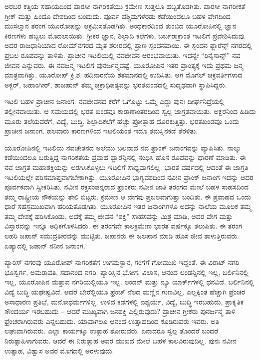ಅರಬರ ಕತ್ತಿಯ ಸಹಾಯದಿಂದ ಪಾರಸೀ ನಾಗರಿಕತೆಯು ಕ್ರಮೇಣ ಸುತ್ತಲೂ ಹಬ್ಬತೊಡಗಿತು. ಪಾರಸೀ ನಾಗರೀಕತೆ ಗ್ರೀಕ್​ ಮತ್ತು ಹಿಂದೂ ದೇಶದಿಂದ ಬಂದುದು. ಪೂರ್ವ ಪಶ್ಚಿಮಗಳೆರಡು ಕಡೆಯಿಂದಲೂ ಬಹಳ ವೇಗದಿಂದ ಮುಸಲ್ಮಾನ ತರಂಗ ಯೂರೋಪನ್ನು ಆಕ್ರಮಿಸತೊಡಗಿತು. ಅಂಧಕಾರದಿಂದ ತುಂಬಿದ ಯೂರೋಪಿನಲ್ಲಿ ಜ್ಞಾನ ಕಿರಣಗಳು ಹಬ್ಬಲು ಮೊದಲಾಯಿತು. ಗ್ರೀಕರ ಜ್ಞಾನ, ಶಿಲ್ಪಾದಿ ಕಲೆಗಳು, ಬರ್ಬರಾ\break ಕ್ರಾಂತ ಇಟಲಿಗೆ ಪ್ರವೇಶಿಸಿದುವು. ಅದರ ರಾಜಧಾನಿಯಾದ ರೋಮ್​ನಗರದ ಮೃತ ಶರೀರದಲ್ಲಿ ಪ್ರಾಣ ಸ್ಪಂದನವಾಯಿ. ಈ ಸ್ಪಂದನ ಫ್ಲಾರೆನ್ಸ್​ ನಗರದಲ್ಲಿ ಪ್ರಬಲ ರೂಪವನ್ನು ತಾಳಿತು. ಪ್ರಾಚೀನ ಇಟಲಿಯಲ್ಲಿ ನವಜೀವನ ಆರಂಭವಾಯಿತು. ಇದನ್ನೇ “ರಿನೈಸಾನ್ಸ್​” ನವ ಜೀವನ ಎನ್ನುವರು. ಈ ನವಜನ್ಮ ಇಟಲಿಗೆ ಪುನರ್ಜನ್ಮವಷ್ಟೆ. ಯೂರೋಪಿನ ಇತರ ಪ್ರಾಂತ್ಯಕ್ಕೆ ಇದು ಪ್ರಥಮ ಜನ್ಮ ಮಾತ್ರವಾಗಿತ್ತು. ಯೂರೋಪ್​ ಕ್ರಿ.ಶ. ಹದಿನಾರನೆಯ ಶತಮಾನದಲ್ಲಿ ಉದಿಸಿತು. ಆಗ ಮೊಗಲ್​ ಚಕ್ರವರ್ತಿಗಳಾದ ಅಕ್ಬರ್​, ಜಹಾಂಗೀರ್​, ಶಾಜಹಾನ್​ ತಮ್ಮ ಚಕ್ರಾಧಿಪತ್ಯವನ್ನು ಭರತಖಂಡದಲ್ಲಿ ಸುದೃಢವಾಗಿ ಸ್ಥಾಪಿಸಿದ್ದರು.

ಇಟಲಿ ಬಹಳ ಪ್ರಾಚೀನ ಜನಾಂಗ. ನವಜೀವನದ ಕರೆಗೆ ಓಗೊಟ್ಟು ಒಮ್ಮೆ ಎದ್ದು ಪುನಃ ದೀರ್ಘನಿದ್ರೆಯಲ್ಲಿ ತಲ್ಲೀನವಾಯಿತು. ಆ ಸಮಯದಲ್ಲಿ ಭರತ ಖಂಡವೂ ಕಾರಾಣಾಂತರ\break ದಿಂದ ಸ್ವಲ್ಪ ಜಾಗ್ರತವಾಯಿತು. ಅಕ್ಬರನಿಂದ ಹಿಡಿದು ಮೂರು ತಲೆಯವರೆಗೆ, ವಿದ್ಯೆ, ಬುದ್ಧಿ, ಶಿಲ್ಪಾದಿಕಲೆಗೆ ಹೆಚ್ಚು ಪ್ರೋತ್ಸಾಹ ದೊರಕುತ್ತಿತ್ತು. ಭರತಖಂಡವೂ ಒಂದು ಪ್ರಾಚೀನ ಜನಾಂಗ. ಹಲವಾರು ಕಾರಣಗಳಿಂದ ಇಟಲಿಯಂತೆ ಇದೂ ತಮಸ್ಸಿನಕಡೆ ತೆರಳಿತು.

ಯೂರೋಪಿನಲ್ಲಿ ಇಟಲಿಯ ನವಚೇತನದ ಅಲೆಯು ಬಲವಾದ ನವ ಫ್ರಾಂಕ್​ ಜನಾಂಗವನ್ನು ವ್ಯಾಪಿಸಿತು. ನಾಲ್ಕು ಕಡೆಯಿಂದಲೂ ಬರುತ್ತಿದ್ದ ನಾಗರಿಕತೆಯ ಪ್ರವಾಹ ಫ್ಲಾರೆನ್ಸಿನಲ್ಲಿ ಸಂಧಿಸಿ ಹೊಸ ರೂಪವನ್ನು ಧಾರಣೆ ಮಾಡಿತು. ಈ ನವ ಜಾಗ್ರತ ಮಹಾಶಕ್ತಿಯನ್ನು ಅರಗಿಸಿಕೊಳ್ಳಲು ಇಟಲಿಗೆ ಸಾಧ್ಯವಾಗಲಿಲ್ಲ. ಭಾರತ ವರ್ಷದಲ್ಲಿ ಆದಂತೆ ಈ ಜಾಗ್ರತಿ ಇಟಲಿಯಲ್ಲೇ ಪರಿಸಮಾಪ್ತವಾಗಬೇಕಾಗಿತ್ತು. ಯೂರೋಪಿನ ಭಾಗ್ಯವಶದಿಂದ ನವೀನ ಫ್ರಾಂಕ್​ ಜನಾಂಗ ಇದನ್ನು ಆದರ ಪೂರ್ವಕವಾಗಿ ಸ್ವೀಕರಿಸಿತು. ನವೀನ ರಕ್ತಸಂಪನ್ನ\break ರಾದ ಫ್ರಾಂಕರು ನವೀನ ಜಾತಿ ತರಂಗದ ಮೇಲೆ ಬಹಳ ಸಾಹಸದಿಂದ ತಮ್ಮ ರಾಷ್ಟ್ರೀಯ ನೌಕೆಯನ್ನು ತೇಲಿ ಬಿಟ್ಟರು. ಕ್ರಮೇಣ ಆ ವೇಗವು ಪ್ರಬಲವಾಗುತ್ತಾ ಬಂದಿತು. ಈ ಪ್ರವಾಹದ ಒಂದು ಧಾರೆ ಸಹಸ್ರಮುಖವಾಗಿ ಹರಿಯತೊಡಗಿತು. ಯೂರೋಪಿನ ಇತರ ಜನಾಂಗಗಳೂ ಅದನ್ನು ನಾಲೆಯ ಮೂಲಕ ತಮ್ಮ ತಮ್ಮ ದೇಶಕ್ಕೆ ಹರಿಸಿಕೊಂಡು, ಅದಕ್ಕೆ ತಮ್ಮ ಜೀವನ “ಶಕ್ತಿ” ಸಾಹಸವನ್ನು ಮಿಶ್ರ ಮಾಡಿ, ಅದರ ವೇಗ ಮತ್ತು ವಿಸ್ತಾರವನ್ನು ಇನ್ನೂ ಅಧಿಕಗೊಳಸಿದರು. ಈ ತರಂಗವೇ ಕಾಲಕ್ರಮೇಣ ಭಾರತ ವರ್ಷಕ್ಕೂ ತಲುಪಿತು. ಈ ತರಂಗ ಲಹರಿ ಜಪಾನ್​ ಸಮುದ್ರತೀರವನ್ನು ಮುಟ್ಟಿತು. ಜಪಾನರು ಈ ಜಲಪಾನ ಮಾಡಿ ಹೊಸ ಜೀವ ತಾಳುತ್ತಿರುವರು. ಏಷ್ಯಾದಲ್ಲಿ ಜಪಾನ್​ ನನೀನ ಜನಾಂಗ.

ಪ್ಯಾರಿಸ್​ ನಗರವು ಯೂರೋಪ್​ ನಾಗರಿಕತೆಗೆ ಉಗಮಸ್ಥಾನ, ಗಂಗೆಗೆ ಗೋಮುಖಿ ಇದ್ದಂತೆ. ಈ ವಿರಾಟ್​ ನಗರಿ ಭೂಸ್ವರ್ಗ, ಅಮರಾವತಿ, ಸದಾನಂದ ನಗರಿ. ಪ್ಯಾರಿಸ್ಸಿನ ಭೋಗ, ವಿಲಾಸ, ಆನಂದ ಲಂಡನ್ನಿನಲ್ಲಿ ಇಲ್ಲ, ಬರ್ಲಿನಿನಲ್ಲಿ ಇಲ್ಲ, ಯೂರೋಪಿನ ಮತ್ತಾವ ನಗರಿಯಲ್ಲಿಯೂ ಇಲ್ಲ. ಲಂಡನ್​ ಮತ್ತು ನ್ಯೂ ಯಾರ್ಕ್​ಗಳಲ್ಲಿ ಧನವಿದೆ. ಬರ್ಲಿನಿನಲ್ಲಿ ವಿದ್ಯೆ ಬುದ್ಧಿ ಯಥೇಷ್ಟವಿದೆ. ಆದರೆ ಬೇರೆಲ್ಲಿಯೂ ಫ್ರೆಂಚ್​ ನೆಲದ ಮಣ್ಣಿನ ಗುಣವಿಲ್ಲ. ಎಲ್ಲಕ್ಕಿಂತ ಹೆಚ್ಚಾಗಿ ಫ್ರೆಂಚರ ಅಸಾಧಾರಣ ಪ್ರತಿಭೆ, ಮನೋಧರ್ಮಗಳಿಲ್ಲ. ಉಳಿದ ಕಡೆಗಳಲ್ಲಿ ಐಶ್ವರ್ಯ, ವಿದ್ಯೆ, ಬುದ್ಧಿ ಇರಬಹುದು, ಪ್ರಾಕೃತಿಕ ಸೌಂದರ್ಯ ಇರಬಹುದು – ಆದರೆ ಮುಖ್ಯವಾಗಿ ಜನಶಕ್ತಿ ಎಲ್ಲಿರುವುದು? ಪ್ರಾಚೀನ ಗ್ರೀಕರು ಪುನರ್ಜನ್ಮ ತಾಳಿ ಫ್ರೆಂಚರಾಗಿರುವರು ಎನ್ನಬಹುದು. ಯಾವಾಗಲೂ ಆನಂದ ಉತ್ಸಾಹದಿಂದ ಕೂಡಿರುವರು ಇವರು. ಅತಿ ಲಘುವಾಗಿರುವರು. ಎಲ್ಲಾ ಕಾರ್ಯಕ್ಕೂ ಉತ್ಸಾಹ ತೋರುವರು. ಏನಾದರೂ ಸ್ವಲ್ಪ ತೊಂದರೆ ಬಂದರೆ ನಿರುತ್ಸಾಹಿಳಾಗುವರು. ಆದರೆ ಈ ನಿರುತ್ಸಾಹ ಅವರ ಮುಖದ ಮೇಲೆ ಬಹಳ ಕಾಲವಿರುವುದಿಲ್ಲ. ಪುನಃ ನವೀನ ಉತ್ಸಾಹ, ವಿಶ್ವಾಸ ಅವರ ಮೊಗದಲ್ಲಿ ಅರಳುವುದು.

